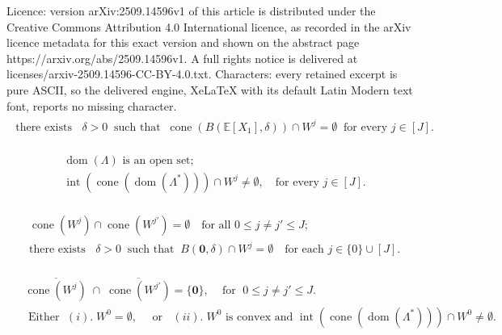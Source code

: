 \documentclass[10pt,a4paper]{amsart}
\newcommand{\Exp}{{\mathbb{E}}}
\begin{document}
Licence: version arXiv:2509.14596v1 of this article is distributed under the Creative Commons Attribution 4.0 International licence, as recorded in the arXiv licence metadata for this exact version and shown on the abstract page https://arxiv.org/abs/2509.14596v1. A full rights notice is delivered at licenses/arxiv-2509.14596-CC-BY-4.0.txt. Characters: every retained excerpt is pure ASCII, so the delivered engine, XeLaTeX with its default Latin Modern text font, reports no missing character.
\begin{align}\tag{C1}\label{assumptions_directions_of_mean}
\begin{split}
\text{there exists } \;\; \delta>0 \;\; \text{such that} \;\;  \operatorname{cone}(B(\Exp[X_1], \delta)) \cap W^j = \emptyset \;\; \text{for every } j \in [J].
\end{split}
\end{align}

\begin{align} \tag{C2} \label{assumption_on_X}
    \begin{split}
        &\operatorname{dom}(\Lambda) \text{ is an open set}; \\
         &\operatorname{int}\left(\operatorname{cone}\left( \operatorname{dom}(\Lambda^*)\right)\right) \cap W^j \neq \emptyset, \quad \text{for  every }  j \in [J].
    \end{split}
\end{align}

\begin{align} \tag{C3} \label{assumption_on_regions}
    \begin{split}
        &\operatorname{cone}(W^j) \cap \operatorname{cone}(W^{j'}) = \emptyset \quad \text{for all } 0 \leq j \neq j' \leq J;\\
        &\text{there exists } \;\; \delta>0 \;\; \text{such that} \;\; B(\mathbf{0}, \delta) \cap W^j = \emptyset \quad \text{for each } j \in \{0\} \cup [J].
    \end{split}
\end{align}

\begin{align}\label{assumption:negative_results}  \tag{C4}
    \begin{split}
    &  \overline{\operatorname{cone}(W^j)} \;\cap\; \overline{\operatorname{cone}(W^{j'})} = \{\mathbf{0}\}, \;\;\; \text{ for } \;0 \leq j \neq j' \leq J. \\
    & \text{ Either } \; (i). \; W^0 = \emptyset, \quad  \text{ or } \;\; (ii).\; W^0 \text{ is convex and } \operatorname{int}\left(\operatorname{cone}\left( \operatorname{dom}(\Lambda^*)\right)\right) \cap W^0 \neq \emptyset.
    \end{split}
\end{align}
\end{document}
